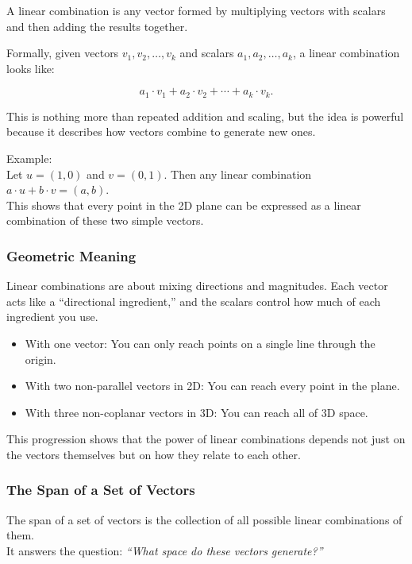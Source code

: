 \documentclass[
  letterpaper,
  DIV=11,
  numbers=noendperiod]{scrreprt}
\providecommand{\tightlist}{%
  \setlength{\itemsep}{0pt}\setlength{\parskip}{0pt}}
\begin{document}
A linear combination is any vector formed by multiplying vectors with
scalars and then adding the results together.

Formally, given vectors \(v_1, v_2, \ldots, v_k\) and scalars
\(a_1, a_2, \ldots, a_k\), a linear combination looks like:

\[
a_1 \cdot v_1 + a_2 \cdot v_2 + \cdots + a_k \cdot v_k.
\]

This is nothing more than repeated addition and scaling, but the idea is
powerful because it describes how vectors combine to generate new ones.

Example:\\
Let \(u = (1, 0)\) and \(v = (0, 1)\). Then any linear combination
\(a \cdot u + b \cdot v = (a, b)\).\\
This shows that every point in the 2D plane can be expressed as a linear
combination of these two simple vectors.

\subsubsection{Geometric Meaning}\label{geometric-meaning}

Linear combinations are about mixing directions and magnitudes. Each
vector acts like a ``directional ingredient,'' and the scalars control
how much of each ingredient you use.

\begin{itemize}
\tightlist
\item
  With one vector: You can only reach points on a single line through
  the origin.
\item
  With two non-parallel vectors in 2D: You can reach every point in the
  plane.
\item
  With three non-coplanar vectors in 3D: You can reach all of 3D space.
\end{itemize}

This progression shows that the power of linear combinations depends not
just on the vectors themselves but on how they relate to each other.

\subsubsection{The Span of a Set of
Vectors}\label{the-span-of-a-set-of-vectors}

The span of a set of vectors is the collection of all possible linear
combinations of them.\\
It answers the question: \emph{``What space do these vectors
generate?''}
\end{document}
